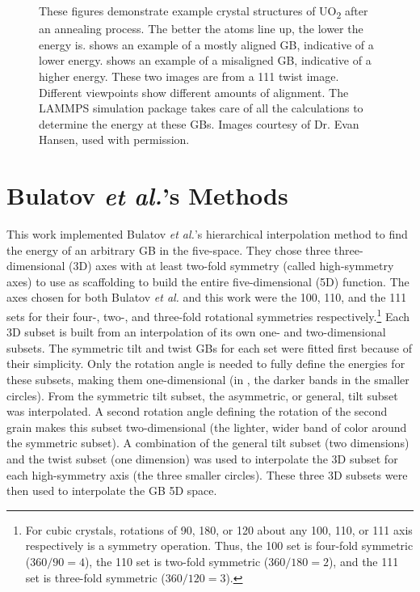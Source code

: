 \documentclass[12pt]{report}
\begin{document}
\begin{figure}[ht!]
 \caption[Example of crystal structures after annealing.]{\label{fig:lammps}These figures demonstrate example crystal structures of UO\textsubscript{2} after an annealing process.  The better the atoms line up, the lower the energy is. \protect{} shows an example of a mostly aligned GB, indicative of a lower energy.  \protect{} shows an example of a misaligned GB, indicative of a higher energy.  These two images are from a \textlangle{}111\textrangle{} twist image.  Different viewpoints show different amounts of alignment.  The LAMMPS simulation package takes care of all the calculations to determine the energy at these GBs. Images courtesy of Dr. Evan Hansen, used with permission.}
\end{figure}

\section{Bulatov \emph{et al.}'s Methods\label{methods:bulatov}}
This work implemented Bulatov \emph{et al.}'s hierarchical interpolation method to find the energy of an arbitrary GB in the five-space.\cite{bulatov2014}  They chose three three-dimensional (3D) axes with at least two-fold symmetry (called high-symmetry axes) to use as scaffolding to build the entire five-dimensional (5D) function.  The axes chosen for both Bulatov \emph{et al.} and this work were the \textlangle{}100\textrangle{}, \textlangle{}110\textrangle{}, and the \textlangle{}111\textrangle{} sets for their four-, two-, and three-fold rotational symmetries respectively.\footnote{For cubic crystals, rotations of 90\textdegree{}, 180\textdegree{}, or 120\textdegree{} about any \textlangle{}100\textrangle{}, \textlangle{}110\textrangle{}, or \textlangle{}111\textrangle{} axis respectively is a symmetry operation.\cite{stokes2007}  Thus, the \textlangle{}100\textrangle{} set is four-fold symmetric (360\textdegree{}$/90$\textdegree{}$=4$), the \textlangle{}110\textrangle{} set is two-fold symmetric (360\textdegree{}$/180$\textdegree{}$=2$), and the \textlangle{}111\textrangle{} set is three-fold symmetric (360\textdegree{}$/120$\textdegree{}$=3$).}  Each 3D subset is built from an interpolation of its own one- and two-dimensional subsets.  The symmetric tilt and twist GBs for each set were fitted first because of their simplicity.  Only the rotation angle is needed to fully define the energies for these subsets, making them one-dimensional (in , the darker bands in the smaller circles).  From the symmetric tilt subset, the asymmetric, or general, tilt subset was interpolated.  A second rotation angle defining the rotation of the second grain makes this subset two-dimensional (the lighter, wider band of color around the symmetric subset).  A combination of the general tilt subset (two dimensions) and the twist subset (one dimension) was used to interpolate the 3D subset for each high-symmetry axis (the three smaller circles).  These three 3D subsets were then used to interpolate the GB 5D space.
\end{document}
